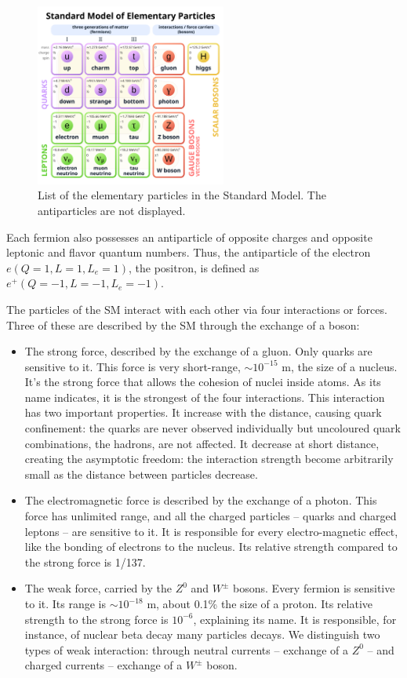 \begin{figure}
  \centering
  \includegraphics[height=6cm]{images/neutrinos/sm.png}
  \caption{List of the elementary particles in the Standard Model. The antiparticles are not displayed.}
  \label{fig:neutrino:sm}
\end{figure}

Each fermion also possesses an antiparticle of opposite charges and opposite leptonic and flavor quantum numbers. Thus, the antiparticle of the electron $e (Q=1, L=1, L_e=1)$, the positron, is defined as $e^+ (Q=-1, L=-1, L_e=-1)$.

The particles of the SM interact with each other via four interactions or forces. Three of these are described by the SM through the exchange of a boson:
\begin{itemize}
  \item The strong force, described by the exchange of a gluon. Only quarks are sensitive to it. This force is very short-range, $\sim 10^{-15}$ m, the size of a nucleus. It's the strong force that allows the cohesion of nuclei inside atoms. As its name indicates, it is the strongest of the four interactions. This interaction has two important properties. It increase with the distance, causing quark confinement: the quarks are never observed individually but uncoloured quark combinations, the hadrons, are not affected. It decrease at short distance, creating the asymptotic freedom: the interaction strength become arbitrarily small as the distance between particles decrease.

  \item The electromagnetic force is described by the exchange of a photon. This force has unlimited range, and all the charged particles -- quarks and charged leptons -- are sensitive to it. It is responsible for every electro-magnetic effect, like the bonding of electrons to the nucleus. Its relative strength compared to the strong force is 1/137.

  \item The weak force, carried by the $Z^0$ and $W^{\pm}$ bosons. Every fermion is sensitive to it. Its range is $\sim 10^{-18}$ m, about 0.1\% the size of a proton. Its relative strength to the strong force is $10^{-6}$, explaining its name. It is responsible, for instance, of nuclear beta decay many particles decays. We distinguish two types of weak interaction: through neutral currents -- exchange of a $Z^0$ -- and charged currents -- exchange of a $W^{\pm}$ boson.
\end{itemize}

